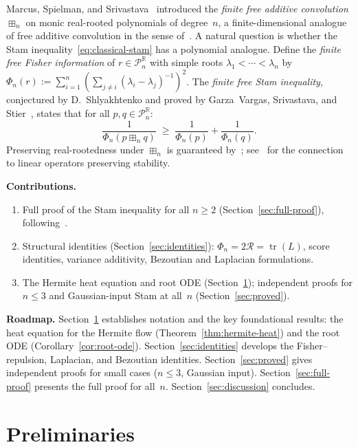 \documentclass[10pt,a4paper]{amsart}
\theoremstyle{plain}
\theoremstyle{definition}
\theoremstyle{remark}
\newcommand{\R}{\mathbb{R}}
\newcommand{\PnR}[1][n]{\mathcal{P}^{\R}_{#1}}
\newcommand{\fp}{\boxplus_n}
\DeclareMathOperator{\tr}{tr}
\begin{document}
Marcus, Spielman, and Srivastava~\cite{MSS2,MSS1}
introduced the \emph{finite free additive convolution}
$\fp$ on monic real-rooted polynomials of degree~$n$,
a finite-dimensional analogue of free additive
convolution in the sense
of~\cite{voiculescu}.
A natural question is whether the Stam
inequality~\eqref{eq:classical-stam} has a polynomial
analogue.
Define the \emph{finite free Fisher information} of
$r\in\PnR$ with simple roots
$\lambda_1<\cdots<\lambda_n$ by
$\Phi_n(r):=\sum_{i=1}^n
(\sum_{j\ne i}(\lambda_i-\lambda_j)^{-1})^{2}$.
The \emph{finite free Stam inequality}, conjectured by
D.~Shlyakhtenko and proved by Garza~Vargas, Srivastava,
and Stier~\cite{GVS}, states that for all $p,q\in\PnR$:
\begin{equation}\label{eq:stam-poly}
  \frac{1}{\Phi_n(p\fp q)}\;\ge\;
  \frac{1}{\Phi_n(p)}+\frac{1}{\Phi_n(q)}.
\end{equation}
Preserving real-rootedness under $\fp$ is guaranteed
by~\cite{MSS2}; see~\cite{bb} for the connection to
linear operators preserving stability.

\noindent\textbf{Contributions.}
\begin{enumerate}[nosep,label=(\roman*)]
\item Full proof of the Stam inequality for all $n\ge 2$
  (Section~\ref{sec:full-proof}), following~\cite{GVS}.
\item Structural identities
  (Section~\ref{sec:identities}):
  $\Phi_n=2\mathcal{R}=\tr(L)$, score identities,
  variance additivity, Bezoutian and Laplacian formulations.
\item The Hermite heat equation
  and root ODE (Section~\ref{sec:prelim});
  independent proofs for $n\le 3$ and
  Gaussian-input Stam at all~$n$
  (Section~\ref{sec:proved}).
\end{enumerate}

\smallskip
\noindent\textbf{Roadmap.}
Section~\ref{sec:prelim} establishes notation
and the key foundational results:
the heat equation for the Hermite flow
(Theorem~\ref{thm:hermite-heat}) and the
root ODE (Corollary~\ref{cor:root-ode}).
Section~\ref{sec:identities} develops
the Fisher--repulsion, Laplacian, and Bezoutian
identities.
Section~\ref{sec:proved} gives independent proofs
for small cases ($n\le 3$, Gaussian input).
Section~\ref{sec:full-proof} presents the full
proof for all~$n$.
Section~\ref{sec:discussion} concludes.


\section{Preliminaries}\label{sec:prelim}
\end{document}
